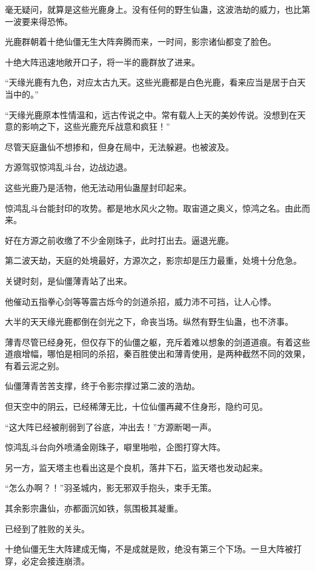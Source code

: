 \begin{this_body}
毫无疑问，就算是这些光鹿身上。没有任何的野生仙蛊，这波浩劫的威力，也比第一波要来得恐怖。

光鹿群朝着十绝仙僵无生大阵奔腾而来，一时间，影宗诸仙都变了脸色。

十绝大阵迅速地敞开口子，将一半的鹿群放了进来。

“天缘光鹿有九色，对应太古九天。这些光鹿都是白色光鹿，看来应当是居于白天当中的。”

“天缘光鹿原本性情温和，远古传说之中。常有载人上天的美妙传说。没想到在天意的影响之下，这些光鹿充斥战意和疯狂！”

尽管天庭蛊仙不想掺和，但身在局中，无法躲避。也被波及。

方源驾驭惊鸿乱斗台，边战边退。

这些光鹿乃是活物，他无法动用仙蛊屋封印起来。

惊鸿乱斗台能封印的攻势。都是地水风火之物。取宙道之奥义，惊鸿之名。由此而来。

好在方源之前收缴了不少金刚珠子，此时打出去。逼退光鹿。

第二波天劫，天庭的处境最好，方源次之，影宗却是压力最重，处境十分危急。

关键时刻，是仙僵薄青站了出来。

他催动五指拳心剑等等震古烁今的剑道杀招，威力沛不可挡，让人心悸。

大半的天天缘光鹿都倒在剑光之下，命丧当场。纵然有野生仙蛊，也不济事。

薄青尽管已经身死，但仅存下的仙僵之躯，充斥着难以想象的剑道道痕。有着这些道痕增幅，哪怕是相同的杀招，秦百胜使出和薄青使用，是两种截然不同的效果，有着云泥之别。

仙僵薄青苦苦支撑，终于令影宗撑过第二波的浩劫。

但天空中的阴云，已经稀薄无比，十位仙僵再藏不住身形，隐约可见。

“这大阵已经被削弱到了谷底，冲出去！”方源断喝一声。

惊鸿乱斗台向外喷涌金刚珠子，噼里啪啦，企图打穿大阵。

另一方，监天塔主也看出这是个良机，落井下石，监天塔也发动起来。

“怎么办啊？！”羽圣城内，影无邪双手抱头，束手无策。

其余影宗蛊仙，亦都面沉如铁，氛围极其凝重。

已经到了胜败的关头。

十绝仙僵无生大阵建成无悔，不是成就是败，绝没有第三个下场。一旦大阵被打穿，必定会接连崩溃。


\end{this_body}
